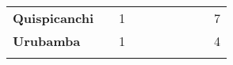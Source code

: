 \begin{tabular}{lccccccccc}
	\textbf{Quispicanchi}                       
    &\cellcolor[HTML]{FCC46C}                   &1                   
	&\cellcolor[HTML]{FCC46C}                   &\cellcolor[HTML]{FCC46C}                  
	&\cellcolor[HTML]{FCC46C}                   &\cellcolor[HTML]{FCC46C} 	  &\cellcolor[HTML]{FCC46C} 					&\cellcolor[HTML]{FCC46C} 					
	&7\\
	\textbf{Urubamba}                                   
	&\cellcolor[HTML]{FCC46C}                   &1                   
	&\cellcolor[HTML]{FCC46C}                   &\cellcolor[HTML]{FCC46C}                     &\cellcolor[HTML]{FCC46C}                   &\cellcolor[HTML]{FCC46C} 		 &\cellcolor[HTML]{FCC46C}					&\cellcolor[HTML]{FCC46C}      
	&4\\
	&\multicolumn{1}{l}{}                       &\multicolumn{1}{l}{}            &\multicolumn{1}{l}{}                         
	&\multicolumn{1}{l}{}                       &\multicolumn{1}{l}{}            &\multicolumn{1}{l}{}                       &\multicolumn{1}{l}{}                       &\multicolumn{1}{l}{}            &\multicolumn{1}{l}{}    
\end{tabular}